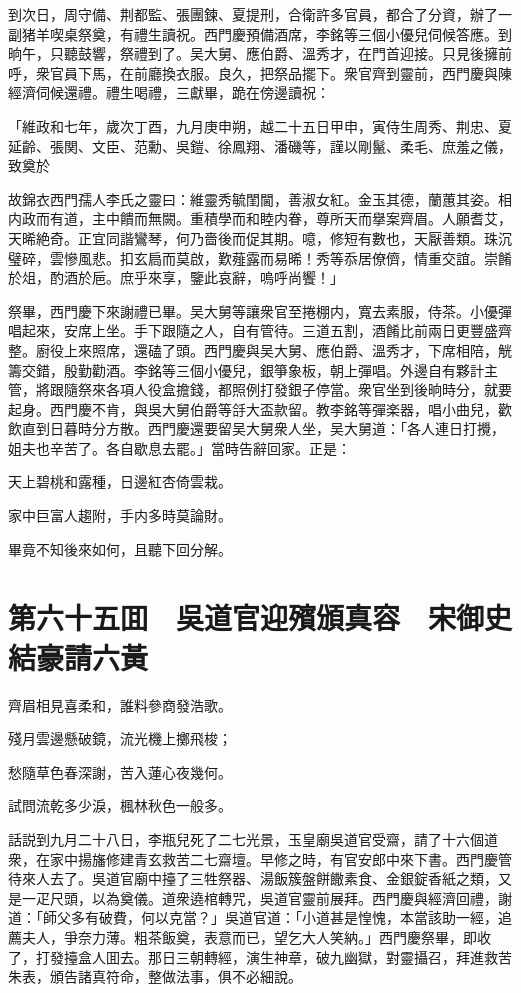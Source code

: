 到次日，周守備、荆都監、張團鍊、夏提刑，合衛許多官員，都合了分資，辦了一副猪羊喫桌祭奠，有禮生讀祝。西門慶預備酒席，李銘等三個小優兒伺候答應。到晌午，只聽鼓響，祭禮到了。吴大舅、應伯爵、溫秀才，在門首迎接。只見後擁前呼，衆官員下馬，在前廳換衣服。良久，把祭品擺下。衆官齊到靈前，西門慶與陳經濟伺候還禮。禮生喝禮，三獻畢，跪在傍邊讀祝：

「維政和七年，歲次丁酉，九月庚申朔，越二十五日甲申，寅侍生周秀、荆忠、夏延齡、張関、文臣、范勳、吳鎧、徐鳳翔、潘磯等，謹以剛鬣、柔毛、庶羞之儀，致奠於

故錦衣西門孺人李氏之靈曰：維靈秀毓閨閫，善淑女紅。金玉其德，蘭蕙其姿。相内政而有道，主中饋而無闕。重積學而和睦内眷，尊所天而擧案齊眉。人願耆艾，天晞絶奇。正宜同諧鸞琴，何乃嗇後而促其期。噫，修短有數也，天厭善類。珠沉璧碎，雲慘風悲。扣玄扃而莫啟，歎薤露而易晞！秀等忝居僚儕，情重交誼。崇餚於俎，酌酒於巵。庶乎來享，鑒此哀辭，嗚呼尚饗！」

祭畢，西門慶下來謝禮已畢。吴大舅等讓衆官至捲棚内，寬去素服，侍茶。小優彈唱起來，安席上坐。手下跟隨之人，自有管待。三道五割，酒餚比前兩日更豐盛齊整。廚役上來照席，還磕了頭。西門慶與吴大舅、應伯爵、溫秀才，下席相陪，觥籌交錯，殷勤勸酒。李銘等三個小優兒，銀箏象板，朝上彈唱。外邊自有夥計主管，將跟隨祭來各項人役盒擔錢，都照例打發銀子停當。衆官坐到後晌時分，就要起身。西門慶不肯，與吳大舅伯爵等㧱大盃款留。教李銘等彈楽器，唱小曲兒，歡飲直到日暮時分方散。西門慶還要留吴大舅衆人坐，吴大舅道：「各人連日打攪，姐夫也辛苦了。各自歇息去罷。」當時告辭回家。正是：

天上碧桃和露種，日邊紅杏倚雲栽。

家中巨富人趨附，手内多時莫論財。

畢竟不知後來如何，且聽下回分解。

\chapter*{第六十五囬　吳道官迎殯頒真容　宋御史結豪請六黃}

齊眉相見喜柔和，誰料參商發浩歌。

殘月雲邊懸破鏡，流光機上擲飛梭；

愁隨草色春深謝，苦入蓮心夜幾何。

試問流乾多少淚，楓林秋色一般多。

話説到九月二十八日，李瓶兒死了二七光景，玉皇廟吳道官受齋，請了十六個道衆，在家中揚旛修建青玄救苦二七齋壇。早修之時，有官安郎中來下書。西門慶管待來人去了。吳道官廟中擡了三牲祭器、湯飯簇盤餅饊素食、金銀錠香紙之類，又是一疋尺頭，以為奠儀。道衆遶棺轉咒，吳道官靈前展拜。西門慶與經濟回禮，謝道：「師父多有破費，何以克當？」吳道官道：「小道甚是惶愧，本當該助一經，追薦夫人，爭奈力薄。粗茶飯奠，表意而已，望乞大人笑納。」西門慶祭畢，即收了，打發擡盒人囬去。那日三朝轉經，演生神章，破九幽獄，對靈攝召，拜進救苦朱表，頒告諸真符命，整做法事，俱不必細說。

